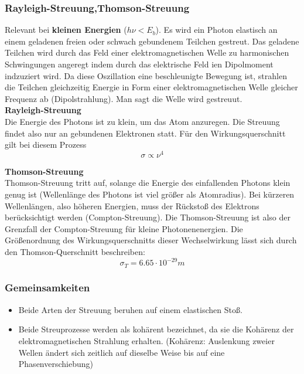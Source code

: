 \documentclass[Ex4_Zusammenfassung.tex]{subfiles}
\begin{document}
\subsubsection{Rayleigh-Streuung,Thomson-Streuung}
Relevant bei \textbf{kleinen Energien} ($h \nu < E_b $). \newline
Es wird ein Photon elastisch an einem geladenen freien oder schwach gebundenem Teilchen gestreut. Das geladene Teilchen wird durch das Feld einer elektromagnetischen Welle zu harmonischen Schwingungen angeregt indem durch das elektrische Feld ien Dipolmoment indzuziert wird. Da diese Oszillation eine beschleunigte Bewegung ist, strahlen die Teilchen gleichzeitig Energie in Form einer elektromagnetischen Welle gleicher Frequenz ab (Dipolstrahlung). Man sagt die Welle wird gestreuut. \\ \newline
\textbf{Rayleigh-Streuung} \\ \newline 
 Die Energie des Photons ist zu klein, um das Atom anzuregen. Die Streuung findet also nur an gebundenen Elektronen statt. Für den Wirkungsquerschnitt gilt bei diesem Prozess
\begin{equation}
\sigma \propto \nu^4
\end{equation}

\textbf{Thomson-Streuung} \\ \newline
Thomson-Streuung tritt auf, solange die Energie des einfallenden Photons klein genug ist (Wellenlänge des Photons ist viel größer als Atomradius). Bei kürzeren Wellenlängen, also höheren Energien, muss der Rückstoß des Elektrons berücksichtigt werden (Compton-Streuung). Die Thomson-Streuung ist also der Grenzfall der Compton-Streuung für kleine Photonenenergien.  Die Größenordnung des Wirkungsquerschnitts dieser Wechselwirkung lässt sich durch den Thomson-Querschnitt beschreiben:
\begin{equation}
\sigma_{T} = 6.65 \cdot 10^{-29}  m 
\end{equation}

\subsubsection{Gemeinsamkeiten}
\begin{itemize}
\item Beide Arten der Streuung beruhen auf einem elastischen Stoß.
\item Beide Streuprozesse werden als kohärent bezeichnet, da sie die Kohärenz der elektromagnetischen Strahlung erhalten. \newline  (Kohärenz: Auslenkung zweier Wellen ändert sich zeitlich auf dieselbe Weise bis auf eine Phasenverschiebung)
\end{itemize}
\end{document}
